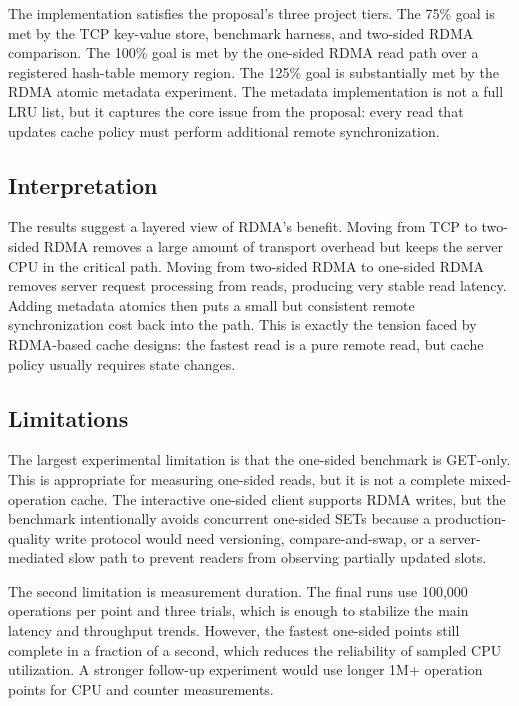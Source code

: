 \documentclass[letterpaper,twocolumn,10pt]{article}
\begin{document}
The implementation satisfies the proposal's three project tiers.  The 75\%
goal is met by the TCP key-value store, benchmark harness, and two-sided RDMA
comparison.  The 100\% goal is met by the one-sided RDMA read path over a
registered hash-table memory region.  The 125\% goal is substantially met by
the RDMA atomic metadata experiment.  The metadata implementation is not a full
LRU list, but it captures the core issue from the proposal: every read that
updates cache policy must perform additional remote synchronization.

\subsection{Interpretation}

The results suggest a layered view of RDMA's benefit.  Moving from TCP to
two-sided RDMA removes a large amount of transport overhead but keeps the
server CPU in the critical path.  Moving from two-sided RDMA to one-sided RDMA
removes server request processing from reads, producing very stable read
latency.  Adding metadata atomics then puts a small but consistent remote
synchronization cost back into the path.  This is exactly the tension faced by
RDMA-based cache designs: the fastest read is a pure remote read, but cache
policy usually requires state changes.

\subsection{Limitations}

The largest experimental limitation is that the one-sided benchmark is
GET-only.  This is appropriate for measuring one-sided reads, but it is not a
complete mixed-operation cache.  The interactive one-sided client supports
RDMA writes, but the benchmark intentionally avoids concurrent one-sided SETs
because a production-quality write protocol would need versioning,
compare-and-swap, or a server-mediated slow path to prevent readers from
observing partially updated slots.

The second limitation is measurement duration.  The final runs use 100,000
operations per point and three trials, which is enough to stabilize the main
latency and throughput trends.  However, the fastest one-sided points still
complete in a fraction of a second, which reduces the reliability of sampled
CPU utilization.  A stronger follow-up experiment would use longer 1M+
operation points for CPU and counter measurements.
\end{document}
